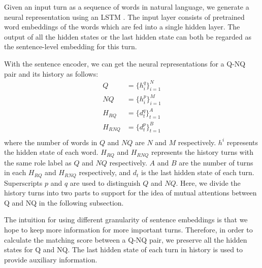 Given an input turn as a sequence of words in natural language, we generate a neural representation using an LSTM \cite{gers1999learning}. The input layer consists of pretrained word embeddings of the words which are fed into a single hidden layer. The output of all the hidden states or the last hidden state can both be regarded as the sentence-level embedding for this turn.

With the sentence encoder, we can get the neural representations for a Q-NQ pair and its history as follows:
\begin{equation}
\begin{aligned}
Q&=\{h_i^q\}_{i=1}^{N}\\
NQ&= \{h_i^p\}_{i=1}^{M}\\
H_{RQ}&=\{d_t^q\}_{t=1}^{A}\\
H_{RNQ}&=\{d_t^p\}_{t=1}^{B}\\
\end{aligned}
\end{equation}
where the number of words in $Q$ and $NQ$ are $N$ and $M$ respectively. $h^i$ represents the hidden state of each word. $H_{RQ}$ and $H_{RNQ}$ represents the history turns with the same role label as $Q$ and $NQ$ respectively. $A$ and $B$ are the number of turns in each $H_{RQ}$ and $H_{RNQ}$ respectively, and $d_t$ is the last hidden state of each turn. Superscripts $p$ and $q$ are used to distinguish $Q$ and $NQ$. Here, we divide the history turns into 
two parts to support for the idea of mutual attentions between Q and NQ
in the following subsection.

The intuition for using different granularity of sentence embeddings is that we hope to 
keep more information for more important turns. Therefore, in order to calculate 
the matching score between a Q-NQ pair, we preserve all the hidden states for Q and NQ. 
The last hidden state of each turn in history is used to provide auxiliary information.





